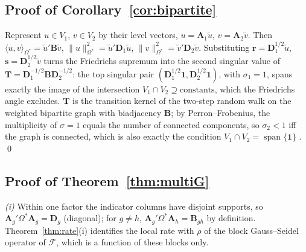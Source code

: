 \documentclass[11pt]{article}
\newcommand{\bB}{\mathbf{B}}
\newcommand{\bD}{\mathbf{D}}
\begin{document}
\subsection{Proof of Corollary~\ref{cor:bipartite}}

Represent $u \in V_1$, $v \in V_2$ by their level vectors, $u =
\mathbf{A}_1\tilde u$, $v = \mathbf{A}_2 \tilde v$.  Then
$\langle u, v\rangle_{\Omega^\ast} = \tilde u' \bB \tilde v$,
$\|u\|^2_{\Omega^\ast} = \tilde u' \bD_1 \tilde u$,
$\|v\|^2_{\Omega^\ast} = \tilde v' \bD_2 \tilde v$.  Substituting
$\mathbf{r} = \bD_1^{1/2}\tilde u$, $\mathbf{s} = \bD_2^{1/2}\tilde v$
turns the Friedrichs supremum into the second singular value of
$\mathbf{T} = \bD_1^{-1/2}\bB\bD_2^{-1/2}$: the top singular pair
$(\bD_1^{1/2}\mathbf{1}, \bD_2^{1/2}\mathbf{1})$, with $\sigma_1 = 1$,
spans exactly the image of the intersection $V_1 \cap V_2 \supseteq
\text{constants}$, which the Friedrichs angle excludes.  $\mathbf{T}$ is
the transition kernel of the two-step random walk on the weighted
bipartite graph with biadjacency $\bB$; by Perron--Frobenius, the
multiplicity of $\sigma = 1$ equals the number of connected components,
so $\sigma_2 < 1$ iff the graph is connected, which is also exactly the
condition $V_1 \cap V_2 = \operatorname{span}\{\mathbf{1}\}$
\citep{abowd1999,gaure2013}. \qed

\subsection{Proof of Theorem~\ref{thm:multiG}}

\emph{(i)}  Within one factor the indicator columns have disjoint
supports, so $\mathbf{A}_g'\Omega^\ast\mathbf{A}_g = \bD_g$ (diagonal);
for $g \ne h$, $\mathbf{A}_g'\Omega^\ast\mathbf{A}_h = \bB_{gh}$ by
definition.  Theorem~\ref{thm:rate}(i) identifies the local rate with
$\rho$ of the block Gauss--Seidel operator of $\mathcal{F}$, which is a
function of these blocks only.
\end{document}
